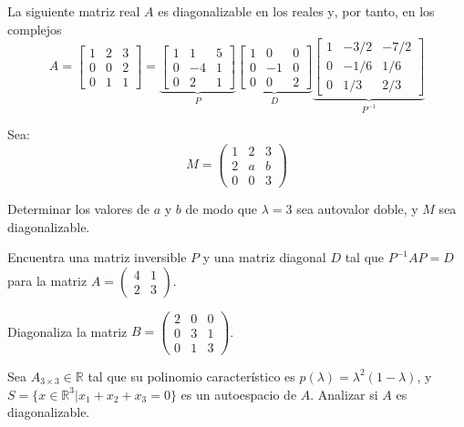 \begin{example}
 La siguiente matriz real $A$ es diagonalizable en los reales $\mathrm{y}$, por tanto, en los complejos\\
 \begin{equation*}
A=\left[\begin{array}{lll}
1 & 2 & 3 \\
0 & 0 & 2 \\
0 & 1 & 1
\end{array}\right]=\underbrace{\left[\begin{array}{ccc}
1 & 1 & 5 \\
0 & -4 & 1 \\
0 & 2 & 1
\end{array}\right]}_P \underbrace{\left[\begin{array}{ccc}
1 & 0 & 0 \\
0 & -1 & 0 \\
0 & 0 & 2
\end{array}\right]}_D\underbrace{\left[\begin{array}{ccc}
1 & -3 / 2 & -7 / 2 \\
0 & -1 / 6 & 1 / 6 \\
0 & 1 / 3 & 2 / 3
\end{array}\right]}_{P^{-1}}
\end{equation*}
\end{example}
\begin{exercise}
    Sea:
\[ M = \begin{pmatrix}
1 & 2 & 3 \\
2 & a & b \\
0 & 0 & 3
\end{pmatrix} \]

Determinar los valores de \( a \) y \( b \) de modo que \( \lambda = 3 \) sea autovalor doble, y \( M \) sea diagonalizable.
\end{exercise}
\begin{exercise}
Encuentra una matriz inversible \( P \) y una matriz diagonal \( D \) tal que \( P^{-1}AP = D \) para la matriz \( A = \begin{pmatrix} 4 & 1 \\ 2 & 3 \end{pmatrix} \).
\end{exercise}
\begin{exercise}
Diagonaliza la matriz \( B = \begin{pmatrix} 2 & 0 & 0 \\ 0 & 3 & 1 \\ 0 & 1 & 3 \end{pmatrix} \).   
\end{exercise}
\begin{exercise}
 Sea \( A_{3 \times 3}  \in \mathbb{R}\) tal que su polinomio característico es \( p(\lambda) = \lambda^2 (1 - \lambda) \), y \( S = \{ {x} \in \mathbb{R}^3 | x_1 + x_2 + x_3 = 0 \} \) es un autoespacio de \( A \). Analizar si \( A \) es diagonalizable.
   
\end{exercise}

